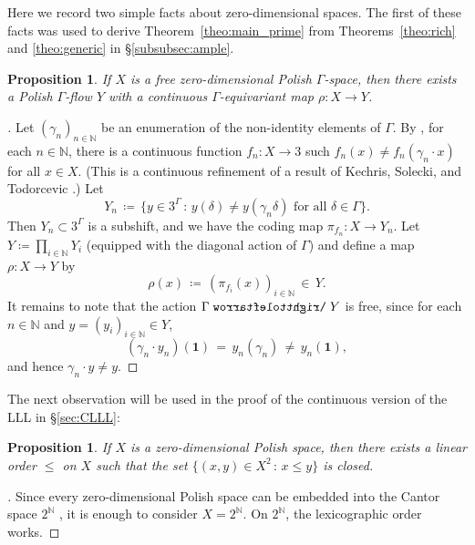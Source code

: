 \documentclass[11pt,reqno,psamsfonts]{amsart}
\theoremstyle{bfnote}
\newtheorem{prop}[theo]{Proposition}
\theoremstyle{definition}
\theoremstyle{remark}
\newcommand{\0}{\varnothing}
\newcommand{\set}[1]{\{#1\}}
\renewcommand{\leq}{\leqslant}
\newcommand{\defeq}{\coloneqq}
\newcommand{\acts}{\mathrel{\reflectbox{$\righttoleftarrow$}}}
\newcommand{\G}{\Gamma}
\newcommand{\N}{\mathbb{N}}
\newcommand{\iden}{\mathbf{1}}
\numberwithin{equation}{section}
\newenvironment{scproof}[1][]{\begin{proof}[\textsc{\upshape{Proof}}#1]}{\end{proof}}
\begin{document}

    Here we record two simple facts about zero-dimensional spaces. The first of these facts was used to derive Theorem~\ref{theo:main_prime} from Theorems~\ref{theo:rich} and \ref{theo:generic} in \S\ref{subsubsec:ample}.

    \begin{prop}\label{prop:map_to_free_flow}
        If $X$ is a free zero-dimensional Polish $\G$-space,  %
        then there exists a Polish $\G$-flow $Y$ with a continuous $\G$-equivariant map $\rho \colon X \to Y$.
    \end{prop}
    \begin{scproof}
        Let $(\gamma_n)_{n \in \N}$ be an enumeration of the non-identity elements of $\G$. By \cite[Lem.~2.3]{Ber_cont}, for each $n \in \N$, there is a continuous function $f_n \colon X \to 3$ such $f_n(x) \neq f_n(\gamma_n \cdot x)$ for all $x \in X$. (This is a continuous refinement of a result of Kechris, Solecki, and Todorcevic \cite[Prop.~4.6]{KST}.) Let
        \[
            Y_n \,\defeq\, \big\{y \in 3^\G \,:\, y(\delta) \neq y(\gamma_n \delta) \text{ for all } \delta \in \G\big\}.
        \]
        Then $Y_n \subset 3^\G$ is a subshift, %
        and we have the coding map $\pi_{f_n} \colon X \to Y_n$. Let $Y \defeq \prod_{i \in \N} Y_i$ (equipped with the diagonal action of $\G$) and define a map $\rho \colon X \to Y$ by
        \[
            \rho(x) \,\defeq\, (\pi_{f_i}(x))_{i \in \N} \,\in\, Y.
        \]
        It remains to note that the action $\G \acts Y$ is free, since for each $n \in \N$ and $y = (y_i)_{i \in \N} \in Y$, %
        \[
            (\gamma_n \cdot y_n)(\iden) \,=\, y_n(\gamma_n) \,\neq\, y_n(\iden),
        \]
        and hence $\gamma_n \cdot y \neq y$. 
    \end{scproof}

    The next observation will be used in the proof of the continuous version of the LLL in \S\ref{sec:CLLL}:

    \begin{prop}\label{prop:order}
        If $X$ is a zero-dimensional Polish space, then there exists a linear order $\leq$ on $X$ such that the set $\set{(x,y) \in X^2 \,:\, x \leq y}$ is closed.
    \end{prop}
    \begin{scproof}
        Since every zero-dimensional Polish space can be embedded into the Cantor space $2^\N$ \cite[Thm.~7.8]{KechrisDST}, it is enough to consider $X = 2^\N$. On $2^\N$, the lexicographic order works. 
    \end{scproof}
\end{document}
